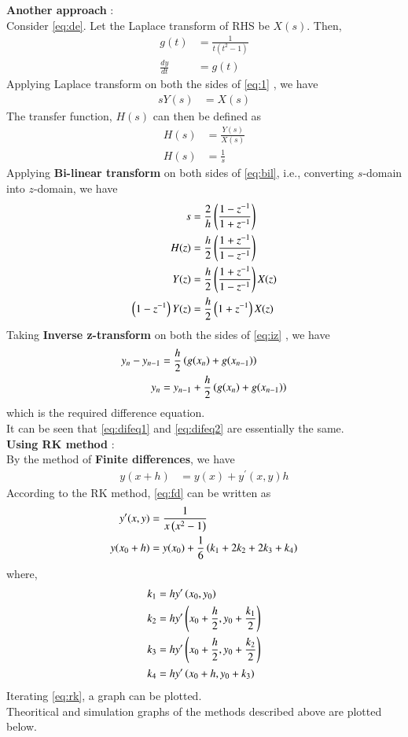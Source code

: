 \documentclass[journal]{IEEEtran}
\begin{document}
\begin{enumerate}
\textbf{Another approach} : \\
Consider \eqref{eq:de}. Let the Laplace transform of RHS be $X(s)$. Then, 
\begin{align}
	g(t) &= \frac{1}{t(t^2 - 1)} \\
	\frac{dy}{dt} &= g(t) \label{eq:1}
\end{align}
Applying Laplace transform on both the sides of \eqref{eq:1} , we have 
\begin{align}
	s Y(s) &= X(s) 
\end{align}
The transfer function, $H(s)$ can then be defined as
\begin{align}
	H(s) &= \frac{Y(s)}{X(s)} \\
	H(s) &= \frac{1}{s} \label{eq:bil}
\end{align}
Applying \textbf{Bi-linear transform} on both sides of \eqref{eq:bil}, i.e., converting $s$-domain into $z$-domain, we have
\begin{align}
	s &= \frac{2}{h} \left(\frac{1 - z^{-1}}{1 + z^{-1}}\right) \\
	H(z) &= \frac{h}{2} \left(\frac{1 + z^{-1}}{1 - z^{-1}}\right) \\
	Y(z) &= \frac{h}{2} \left(\frac{1 + z^{-1}}{1 - z^{-1}}\right) X(z) \\
	\left(1 - z^{-1}\right) Y(z) &= \frac{h}{2} \left(1 + z^{-1}\right) X(z) \label{eq:iz} 
\end{align}
Taking \textbf{Inverse z-transform} on both the sides of \eqref{eq:iz} , we have
\begin{align}
	y_{n} - y_{n-1} &= \frac{h}{2} \left(g(x_{n}) + g(x_{n-1})\right) \\
	y_{n} &= y_{n-1} + \frac{h}{2} \left(g(x_{n}) + g(x_{n-1})\right) \label{eq:difeq2}
\end{align}
which is the required difference equation. \\
It can be seen that \eqref{eq:difeq1} and \eqref{eq:difeq2} are essentially the same. \\
\textbf{Using RK method} : \\
By the method of \textbf{Finite differences}, we have \\
\begin{align}
	y(x + h) &= y(x) + y^{\prime}(x,y) h \label{eq:fd}
\end{align}
According to the RK method, \eqref{eq:fd} can be written as
\begin{align}
	y^{\prime} (x,y) &= \frac{1}{x \left(x^2 - 1\right)} \\
	y(x_0 + h) &= y(x_0) + \frac{1}{6} \left(k_1 + 2k_2 + 2k_3 + k_4\right) \label{eq:rk}
\end{align}
where, 
\begin{align}
	k_1 &= h y^{\prime} \left(x_0, y_0\right) \\
	k_2 &= h y^{\prime} \left(x_0 + \frac{h}{2}, y_0 + \frac{k_1}{2}\right) \\
	k_3 &= h y^{\prime} \left(x_0 + \frac{h}{2}, y_0 + \frac{k_2}{2}\right) \\
	k_4 &= h y^{\prime} \left(x_0 + h, y_0 + k_3\right)
\end{align}
Iterating \eqref{eq:rk}, a graph can be plotted. \\
Theoritical and simulation graphs of the methods described above are plotted below.


\end{enumerate}
\end{document}
